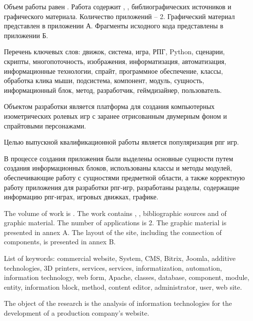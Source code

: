 
Объем работы равен . Работа содержит , ,  библиографических источников и  графического материала. Количество приложений – 2. Графический материал представлен в приложении А. Фрагменты исходного кода представлены в приложении Б.

Перечень ключевых слов: движок, система, игра, РПГ, Python, сценарии, скрипты, многопоточность, изображения, информатизация, автоматизация, информационные технологии, спрайт,  программное обеспечение, классы, обработка клика мыши, подсистема, компонент, модуль, сущность, информационный блок, метод, разработчик, геймдизайнер, пользователь.

Объектом разработки является платформа для создания компьютерных изометрических ролевых игр с заранее отрисованным двумерным фоном и спрайтовыми персонажами.

Целью выпускной квалификационной работы является популяризация рпг игр.

В процессе создания приложения были выделены основные сущности путем создания информационных блоков, использованы классы и методы модулей, обеспечивающие работу с сущностями предметной области, а также корректную работу приложения для разработки рпг-игр, разработаны разделы, содержащие информацию рпг-играх, игровых движках, графике.

  
The volume of work is . The work contains , ,  bibliographic sources and  of graphic material. The number of applications is 2. The graphic material is presented in annex A. The layout of the site, including the connection of components, is presented in annex B.

List of keywords: commercial website, System, CMS, Bitrix, Joomla, additive technologies, 3D printers, services, services, informatization, automation, information technology, web form, Apache, classes, database, component, module, entity, information block, method, content editor, administrator, user, web site.

The object of the research is the analysis of information technologies for the development of a production company's website.

